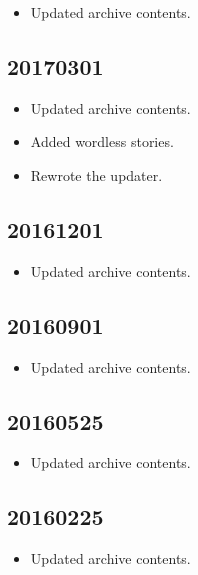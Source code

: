 \documentclass[hidelinks,a4paper,12pt]{article}
\begin{document}
\begin{itemize}
\item Updated archive contents.
\end{itemize}

\subsection{20170301}  \label{sec:changelog_20170301}

\begin{itemize}
\item Updated archive contents.
\item Added wordless stories.
\item Rewrote the updater.
\end{itemize}

\subsection{20161201}  \label{sec:changelog_20161201}

\begin{itemize}
\item Updated archive contents.
\end{itemize}

\subsection{20160901}  \label{sec:changelog_20160901}

\begin{itemize}
\item Updated archive contents.
\end{itemize}

\subsection{20160525}  \label{sec:changelog_20160525}

\begin{itemize}
\item Updated archive contents.
\end{itemize}

\subsection{20160225}  \label{sec:changelog_20160225}

\begin{itemize}
\item Updated archive contents.
\end{itemize}
\end{document}

